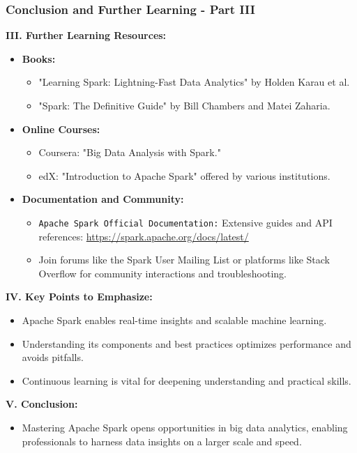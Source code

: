 \documentclass[aspectratio=169]{beamer}
\begin{document}
\begin{frame}[fragile]
    \frametitle{Conclusion and Further Learning - Part III}
    \textbf{III. Further Learning Resources:}
    \begin{itemize}
        \item \textbf{Books:}
        \begin{itemize}
            \item "Learning Spark: Lightning-Fast Data Analytics" by Holden Karau et al.
            \item "Spark: The Definitive Guide" by Bill Chambers and Matei Zaharia.
        \end{itemize}
        
        \item \textbf{Online Courses:}
        \begin{itemize}
            \item Coursera: "Big Data Analysis with Spark."
            \item edX: "Introduction to Apache Spark" offered by various institutions.
        \end{itemize}
        
        \item \textbf{Documentation and Community:}
        \begin{itemize}
            \item \texttt{Apache Spark Official Documentation:} Extensive guides and API references: \url{https://spark.apache.org/docs/latest/}
            \item Join forums like the Spark User Mailing List or platforms like Stack Overflow for community interactions and troubleshooting.
        \end{itemize}
    \end{itemize}

    \textbf{IV. Key Points to Emphasize:}
    \begin{itemize}
        \item Apache Spark enables real-time insights and scalable machine learning.
        \item Understanding its components and best practices optimizes performance and avoids pitfalls.
        \item Continuous learning is vital for deepening understanding and practical skills.
    \end{itemize}

    \textbf{V. Conclusion:}
    \begin{itemize}
        \item Mastering Apache Spark opens opportunities in big data analytics, enabling professionals to harness data insights on a larger scale and speed.
    \end{itemize}
\end{frame}
\end{document}
